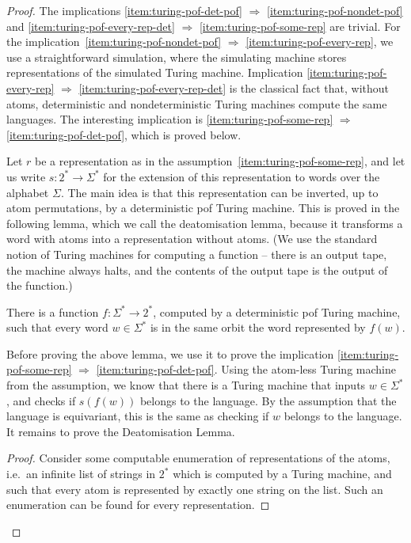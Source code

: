 \begin{proof}
    The implications \ref{item:turing-pof-det-pof} $\Rightarrow$ \ref{item:turing-pof-nondet-pof} and \ref{item:turing-pof-every-rep-det} $\Rightarrow$ \ref{item:turing-pof-some-rep} are trivial. 
    For the implication~\ref{item:turing-pof-nondet-pof} $\Rightarrow$ \ref{item:turing-pof-every-rep}, we use a straightforward simulation, where the simulating machine stores representations of the simulated Turing machine.
    Implication \ref{item:turing-pof-every-rep} $\Rightarrow$ \ref{item:turing-pof-every-rep-det} is the classical fact that, without atoms, deterministic and nondeterministic Turing machines compute the same languages. The interesting implication is \ref{item:turing-pof-some-rep} $\Rightarrow$ \ref{item:turing-pof-det-pof}, which is proved below.
    
    Let $r$ be a representation as in the assumption~\ref{item:turing-pof-some-rep}, and let us write $s : 2^* \to \Sigma^*$ for the extension of this representation to words over the alphabet $\Sigma$. The main idea is that this representation can be inverted, up to atom permutations, by a deterministic pof Turing machine. This is proved in the following lemma, which we call the deatomisation lemma, because it transforms a word with atoms into a representation without atoms.   (We use the standard notion of Turing machines for computing a function -- there is an output tape, the machine always halts, and the contents of the output tape is the output of the function.)

    \begin{lemma}[Deatomisation]\label{lem:deatomisation}
        There is a function $f: \Sigma^* \to 2^*$, 
         computed by a deterministic pof Turing machine,  such that  every word $w \in \Sigma^*$ is in the same orbit the word represented by $f(w)$.
    \end{lemma}

    Before proving the above lemma, we use it to prove the implication \ref{item:turing-pof-some-rep} $\Rightarrow$ \ref{item:turing-pof-det-pof}. Using the atom-less Turing machine from the  assumption, we know that there is a Turing machine that  inputs $w \in \Sigma^*$, and checks if  $s(f(w))$ belongs to the language. By the assumption that the language is equivariant, this is the same as checking if $w$ belongs to the language. It remains to prove the Deatomisation Lemma.

    \begin{proof}
        Consider some computable enumeration of representations of the atoms, i.e.~an infinite list of strings in $2^*$ 
        which is computed by a Turing machine, and such that every atom is represented by exactly one string on the list. Such an enumeration can be found for every representation. 


\end{proof}
\end{proof}
